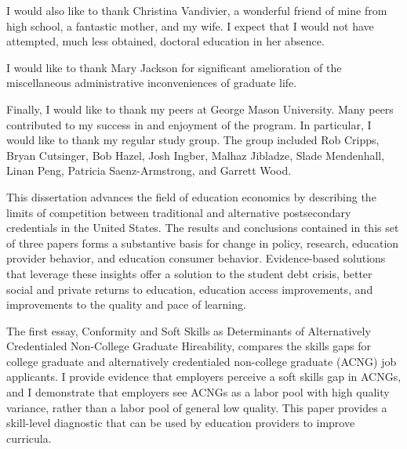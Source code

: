 \documentclass[11 pt]{report}
\begin{document}
\bigskip

\noindent I would also like to thank Christina Vandivier,
a wonderful friend of mine from high school,
a fantastic mother,
and my wife.
I expect that I would not have attempted, much less obtained, doctoral education in her absence.

\bigskip

\noindent I would like to thank Mary Jackson for significant amelioration of the miscellaneous administrative inconveniences of graduate life.

\bigskip

\noindent Finally, I would like to thank my peers at George Mason University.
Many peers contributed to my success in and enjoyment of the program.
In particular, I would like to thank my regular study group.
The group included Rob Cripps, Bryan Cutsinger, Bob Hazel, Josh Ingber, Malhaz Jibladze, Slade Mendenhall,
Linan Peng, Patricia Saenz-Armstrong, and Garrett Wood.



\tableofcontents
\listoftables
\listoffigures


\abstractpage

This dissertation advances the field of education economics by describing the limits of competition between traditional and alternative postsecondary credentials in the United States. The results and conclusions contained in this set of three papers forms a substantive basis for change in policy, research, education provider behavior, and education consumer behavior. Evidence-based solutions that leverage these insights offer a solution to the student debt crisis, better social and private returns to education, education access improvements, and improvements to the quality and pace of learning.

The first essay, Conformity and Soft Skills as Determinants of Alternatively Credentialed Non-College Graduate Hireability, compares the skills gaps for college graduate and alternatively credentialed non-college graduate (ACNG) job applicants. I provide evidence that employers perceive a soft skills gap in ACNGs, and I demonstrate that employers see ACNGs as a labor pool with high quality variance, rather than a labor pool of general low quality. This paper provides a skill-level diagnostic that can be used by education providers to improve curricula.
\end{document}
